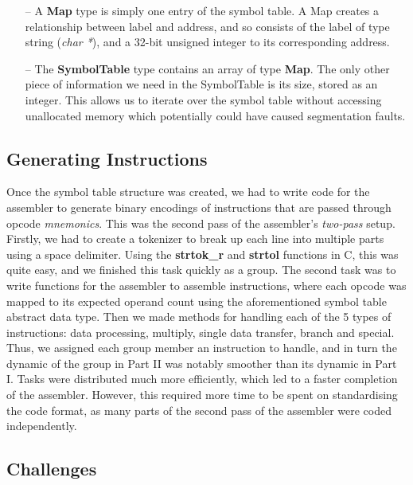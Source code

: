 \documentclass[11pt]{article}
\begin{document}
\begin{itemize}
  \item[--] A \textbf{Map} type is simply one entry of the symbol table. A Map creates a relationship between label and address, and so consists of the label of type string (\emph{char *}), and a 32-bit unsigned integer to its corresponding address.

  \item[--] The \textbf{SymbolTable} type contains an array of type \textbf{Map}. The only other piece of information we need in the SymbolTable is its size, stored as an integer. This allows us to iterate over the symbol table without accessing unallocated memory which potentially could have caused segmentation faults.

\end{itemize}

\subsection{Generating Instructions}

Once the symbol table structure was created, we had to write code for the assembler to generate binary encodings of instructions that are passed through opcode \emph{mnemonics}. This was the second pass of the assembler's \emph{two-pass} setup. Firstly, we had to create a tokenizer to break up each line into multiple parts using a space delimiter. Using the \textbf{strtok\_r} and \textbf{strtol} functions in C, this was quite easy, and we finished this task quickly as a group. The second task was to write functions for the assembler to assemble instructions, where each opcode was mapped to its expected operand count using the aforementioned symbol table abstract data type. Then we made methods for handling each of the 5 types of instructions: data processing, multiply, single data transfer, branch and special. Thus, we assigned each group member an instruction to handle, and in turn the dynamic of the group in Part II was notably smoother than its dynamic in Part I. Tasks were distributed much more efficiently, which led to a faster completion of the assembler. However, this required more time to be spent on standardising the code format, as many parts of the second pass of the assembler were coded independently.

\subsection{Challenges}
\end{document}
